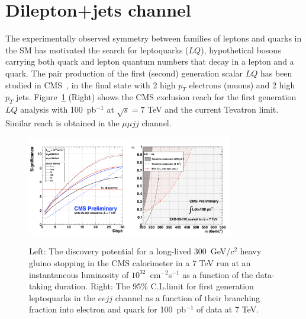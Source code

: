 \documentclass{cmspaper}
\begin{document}
\section{Dilepton+jets channel} \label{leptonjet}
The experimentally observed symmetry between families of  
leptons and quarks in the SM has motivated the search for leptoquarks ($LQ$), 
hypothetical bosons carrying both quark and lepton quantum numbers 
that decay in a lepton and a quark.
The pair production of the first (second) generation scalar $LQ$ has been studied in CMS~\cite{LQPAS}, 
in the final state with 2 high $p_T$ electrons (muons) and 2 high $p_T$ jets. 
Figure~\ref{fig:StoppedHadron_LQ} (Right) shows the CMS exclusion reach for the first generation $LQ$ analysis 
with 100~pb$^{-1}$ at $\sqrt{s} = 7$ TeV and the current Tevatron limit. Similar reach is obtained in the $\mu\mu jj$ channel.

\begin{figure}[htbp] 
\centering
\includegraphics[width=0.4\textwidth]{SG1.pdf}\includegraphics[width=0.4\textwidth]{LQ1_95.pdf}  
\caption{Left: The discovery potential for a long-lived 300~GeV/$c^2$ heavy gluino stopping in the CMS calorimeter 
in a 7 TeV run at an instantaneous luminosity of $10^{32}$~cm$^{-2}$s$^{-1}$ as a function of the data-taking 
duration. Right: The 95\% C.L.limit for first generation leptoquarks in the $ee jj$ channel as 
a function of their branching fraction into electron and quark for 100~pb$^{-1}$ of data at 7 TeV.}
\label{fig:StoppedHadron_LQ}
\end{figure}
\end{document}
